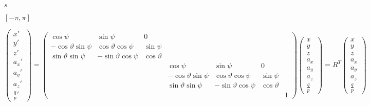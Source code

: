 \documentclass{article}
\begin{document}
$ s $
\pagebreak

$ [ -\pi, \pi ] $
\pagebreak

\[ \left(\begin{array}{c} x'\\ y'\\ z'\\ a_{x}'\\ a_{y}'\\ a_{z}'\\ \frac{q}{p}'\end{array}\right)=\left(\begin{array}{ccccccc} \cos\psi & \sin\psi & 0\\ -\cos\vartheta\sin\psi & \cos\vartheta\cos\psi & \sin\psi\\ \sin\vartheta\sin\psi & -\sin\vartheta\cos\psi & \cos\vartheta\\ & & & \cos\psi & \sin\psi & 0\\ & & & -\cos\vartheta\sin\psi & \cos\vartheta\cos\psi & \sin\psi\\ & & & \sin\vartheta\sin\psi & -\sin\vartheta\cos\psi & \cos\vartheta\\ & & & & & & 1\end{array}\right)\left(\begin{array}{c} x\\ y\\ z\\ a_{x}\\ a_{y}\\ a_{z}\\ \frac{q}{p}\end{array}\right)=R^{T}\left(\begin{array}{c} x\\ y\\ z\\ a_{x}\\ a_{y}\\ a_{z}\\ \frac{q}{p}\end{array}\right)\]
\pagebreak
\end{document}
